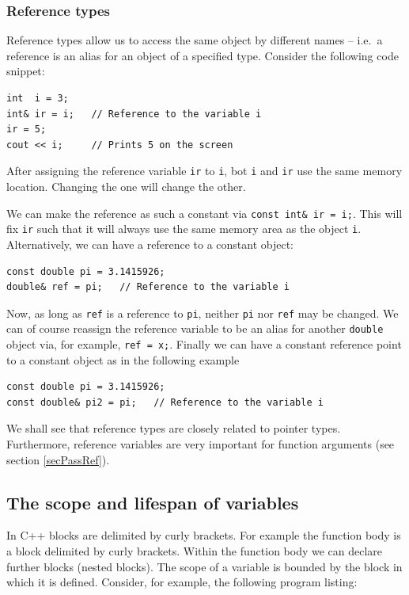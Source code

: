
\subsubsection{Reference types}

Reference types allow us to access the same object by different names -- i.e.\ a reference
is an alias for an object of a specified type. Consider the following code snippet:
{\small \begin{verbatim}
int  i = 3;
int& ir = i;   // Reference to the variable i
ir = 5;
cout << i;     // Prints 5 on the screen
\end{verbatim}}
\noindent
After assigning the reference variable \verb+ir+ to \verb+i+, bot \verb+i+ and
\verb+ir+ use the same memory location. Changing the one will change the other.

We can make the reference as such a constant via \verb+const int& ir = i;+. This
will fix \verb+ir+ such that it will always use the same memory area as the
object \verb+i+. Alternatively, we can have a reference to a constant object:
{\small \begin{verbatim}
const double pi = 3.1415926;
double& ref = pi;   // Reference to the variable i
\end{verbatim}}
\noindent
Now, as long as \verb+ref+ is a reference to \verb+pi+, neither \verb+pi+ nor
\verb+ref+ may be changed. We can of course reassign the reference variable
to be an alias for another \verb+double+ object via, for example, \verb+ref = x;+.
Finally we can have a constant reference point to a constant object as in the
following example
{\small \begin{verbatim}
const double pi = 3.1415926;
const double& pi2 = pi;   // Reference to the variable i
\end{verbatim}}

We shall see that reference types are closely related to pointer types. Furthermore,
reference variables are very important for function arguments
(see section \ref{secPassRef}).


\subsection{The scope and lifespan of variables}

In C++ blocks are delimited by curly brackets. For example the function body
is a block delimited by curly brackets. Within the function body we can declare
further blocks (nested blocks). The scope of a variable is
bounded by the block in which it is defined. Consider, for example, the following
program listing:

